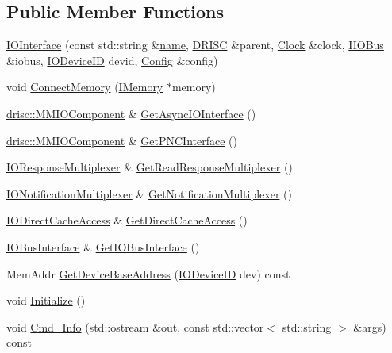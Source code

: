 \subsection*{Public Member Functions}
\begin{DoxyCompactItemize}
\item 
\hyperlink{class_simulator_1_1drisc_1_1_i_o_interface_a01c2b6cd701f5d3376be533b193a6aa7}{I\+O\+Interface} (const std\+::string \&\hyperlink{mtconf_8c_a8f8f80d37794cde9472343e4487ba3eb}{name}, \hyperlink{class_simulator_1_1_d_r_i_s_c}{D\+R\+I\+S\+C} \&parent, \hyperlink{class_simulator_1_1_clock}{Clock} \&clock, \hyperlink{class_simulator_1_1_i_i_o_bus}{I\+I\+O\+Bus} \&iobus, \hyperlink{namespace_simulator_a3493d987c866ad6b8aaa704c42502db0}{I\+O\+Device\+I\+D} devid, \hyperlink{class_config}{Config} \&config)
\item 
void \hyperlink{class_simulator_1_1drisc_1_1_i_o_interface_a1a1f9e2996386bc86fc5a2a038d53fb6}{Connect\+Memory} (\hyperlink{class_simulator_1_1_i_memory}{I\+Memory} $\ast$memory)
\item 
\hyperlink{class_simulator_1_1drisc_1_1_m_m_i_o_component}{drisc\+::\+M\+M\+I\+O\+Component} \& \hyperlink{class_simulator_1_1drisc_1_1_i_o_interface_a5a8c70eead9c1e8e76193d751066df83}{Get\+Async\+I\+O\+Interface} ()
\item 
\hyperlink{class_simulator_1_1drisc_1_1_m_m_i_o_component}{drisc\+::\+M\+M\+I\+O\+Component} \& \hyperlink{class_simulator_1_1drisc_1_1_i_o_interface_ad10ea2082cf082ae2367c44876333c86}{Get\+P\+N\+C\+Interface} ()
\item 
\hyperlink{class_simulator_1_1drisc_1_1_i_o_response_multiplexer}{I\+O\+Response\+Multiplexer} \& \hyperlink{class_simulator_1_1drisc_1_1_i_o_interface_a201c2e66d3074e01fa283d3531835aed}{Get\+Read\+Response\+Multiplexer} ()
\item 
\hyperlink{class_simulator_1_1drisc_1_1_i_o_notification_multiplexer}{I\+O\+Notification\+Multiplexer} \& \hyperlink{class_simulator_1_1drisc_1_1_i_o_interface_a6b37979284cb1403df85526baefbf9af}{Get\+Notification\+Multiplexer} ()
\item 
\hyperlink{class_simulator_1_1drisc_1_1_i_o_direct_cache_access}{I\+O\+Direct\+Cache\+Access} \& \hyperlink{class_simulator_1_1drisc_1_1_i_o_interface_a1edf34a655ff1591c4be4230e285cf0b}{Get\+Direct\+Cache\+Access} ()
\item 
\hyperlink{class_simulator_1_1drisc_1_1_i_o_bus_interface}{I\+O\+Bus\+Interface} \& \hyperlink{class_simulator_1_1drisc_1_1_i_o_interface_abdd18b43cecb928670e0acf178b11a09}{Get\+I\+O\+Bus\+Interface} ()
\item 
Mem\+Addr \hyperlink{class_simulator_1_1drisc_1_1_i_o_interface_a1610c95f6ad4333608e44f99bfe507b6}{Get\+Device\+Base\+Address} (\hyperlink{namespace_simulator_a3493d987c866ad6b8aaa704c42502db0}{I\+O\+Device\+I\+D} dev) const 
\item 
void \hyperlink{class_simulator_1_1drisc_1_1_i_o_interface_ad84bbe534d545f489cef52a30476ab3a}{Initialize} ()
\item 
void \hyperlink{class_simulator_1_1drisc_1_1_i_o_interface_af137ac424b0a52466aed8090a2bcaba7}{Cmd\+\_\+\+Info} (std\+::ostream \&out, const std\+::vector$<$ std\+::string $>$ \&args) const 
\end{DoxyCompactItemize}
